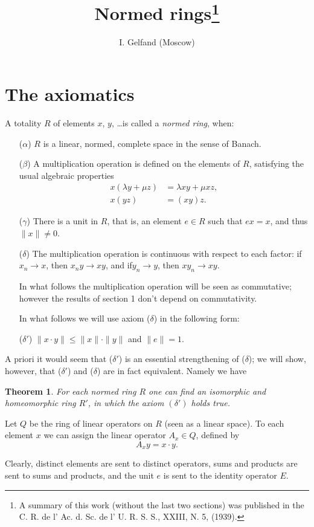 \documentclass{article}
\title{Normed rings\footnote{A summary of this work (without the last two sections) was published in the C. R. de l' Ac. d. Sc. de l' U. R. S. S., XXIII, N. 5, (1939).}}
\author{I. Gelfand (Moscow)}
\date{}%
\newtheorem{theorem}{Theorem}
\theoremstyle{definition}
\begin{document}
\maketitle

\section{The axiomatics}
A totality $R$ of elements $x$, $y$, \dots is called a \emph{normed ring}, when:
\begin{enumerate}
\item [($\alpha$)] $R$ is a linear, normed, complete space in the sense of Banach.
\item [($\beta$)] A multiplication operation is defined on the elements of $R$, satisfying the usual algebraic properties
  \begin{align*}
    x(\lambda y + \mu z) &= \lambda xy + \mu xz,\\
    x(yz) &= (xy)z.
  \end{align*}
\item [($\gamma$)] There is a unit in $R$, that is, an element $e\in R$ such that $ex=x$, and thus $\| x \| \neq 0$.
\item [($\delta$)]
  The multiplication operation is continuous with respect to each factor: if $x_n \to x$, then $x_n y \to xy$, and if$y_n \to y$, then $xy_n \to xy$.
  
  In what follows the multiplication operation will be seen as commutative; however the results of section 1 don't depend on commutativity.

  In what follows we will use axiom ($\delta$) in the following form:
\item [($\delta'$)] $\|x\cdot y\| \leq \|x\|\cdot\|y\|$ and $\|e\| = 1$.
\end{enumerate}
A priori it would seem that ($\delta'$) is an essential strengthening of ($\delta$); we will show, however, that ($\delta'$) and ($\delta$) are in fact equivalent. Namely we have
\begin{theorem}
  For each normed ring $R$ one can find an isomorphic and homeomorphic ring $R'$, in which the axiom $(\delta')$ holds true.
\end{theorem}
Let $Q$ be the ring of linear operators on $R$ (seen as a linear space). To each element $x$ we can assign the linear operator $A_x\in Q$, defined by
$$A_x y = x\cdot y.$$

Clearly, distinct elements are sent to distinct operators, sums and products are sent to sums and products, and the unit $e$ is sent to the identity operator $E$.
\end{document}
